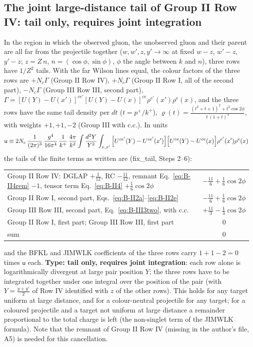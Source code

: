 \subsection{The joint large-distance tail of Group II Row IV: tail only, requires joint integration}\label{sec:C6}
In the region in which the observed gluon, the unobserved gluon and their parent are all far from the projectile together ($w,w',z,y'\to\infty$ at fixed $w-z$, $w'-z$, $y'-z$; $z=Z\,n$, $n=(\cos\phi,\sin\phi)$, $\phi$ the angle between $k$ and $n$), three rows have $1/Z^{2}$ tails. With the far Wilson lines equal, the colour factors of the three rows are $+N_{c}\Gamma$ (Group II Row IV), $+N_{c}\Gamma$ (Group II Row I, all of the second part), $-N_{c}\Gamma$ (Group III Row III, second part), $\Gamma=[U(Y)-U(x')]^{ce'}[U(Y)-U(x)]^{ce}\rho^{e'}(x')\rho^{e}(x)$, and the three rows have the same tail density per $dt$ ($t=p^{+}/k^{+}$), $\varrho(t)=\frac{(t^{2}+t+1)^{2}+t^{2}\cos2\phi}{t\,(1+t)^{4}}$, with weights $+1,+1,-2$ (Group III with c.c.). In units
\begin{align}
\mathsf{u}\equiv2N_{c}\,\frac{1}{(2\pi)^{3}}\,\frac{g^{4}}{16\pi^{4}}\,\frac{1}{k^{+}}\,\frac{4\pi}{k^{2}}\int\frac{d^{2}Y}{Y^{2}}\int_{x,x'}\Big[U^{ce'}(Y)-U^{ce'}(x')\Big]\Big[U^{ce}(Y)-U^{ce}(x)\Big]\rho^{e'}(x')\rho^{e}(x)\notag
\end{align}
the tails of the finite terms as written are (fix\_tail, Steps 2--6):
\begin{center}
\renewcommand{\arraystretch}{1.3}\small
\begin{tabular}{|l|c|}\hline
{\color{cJt}Group II Row IV: DGLAP $+\frac{1}{12}$, RC $-\frac{11}{12}$, remnant Eq.~\eqref{eq:B-II4rem} $-1$, tensor term Eq.~\eqref{eq:B-II4} $+\frac16\cos2\phi$} & {\color{cJt}$-\frac{11}{6}+\frac16\cos2\phi$}\\
{\color{cJt}Group II Row I, second part, Eqs.~\eqref{eq:B-II2a}--\eqref{eq:B-II2e}} & {\color{cJt}$-\frac{11}{6}+\frac16\cos2\phi$}\\
{\color{cJt}Group III Row III, second part, Eq.~\eqref{eq:B-III3two}, with c.c.} & {\color{cJt}$+\frac{11}{3}-\frac13\cos2\phi$}\\
Group II Row I, first part; Group III Row III, first part & $0$\\\hline
sum & $0$\\\hline
\end{tabular}
\end{center}
and the BFKL and JIMWLK coefficients of the three rows carry $1+1-2=0$ times $\mathsf{u}$ each. \textbf{Type: tail only, requires joint integration}: each row alone is logarithmically divergent at large pair position $Y$; the three rows have to be integrated together under one integral over the position of the pair (with $Y=\frac{y+y'}{2}$ of Row IV identified with $z$ of the other rows). This holds for any target uniform at large distance, and for a colour-neutral projectile for any target; for a coloured projectile and a target not uniform at large distance a remainder proportional to the total charge is left (the non-singlet term of the JIMWLK formula). Note that the remnant of Group II Row IV (missing in the author's file, \NOTE{} A5) is needed for this cancellation.
